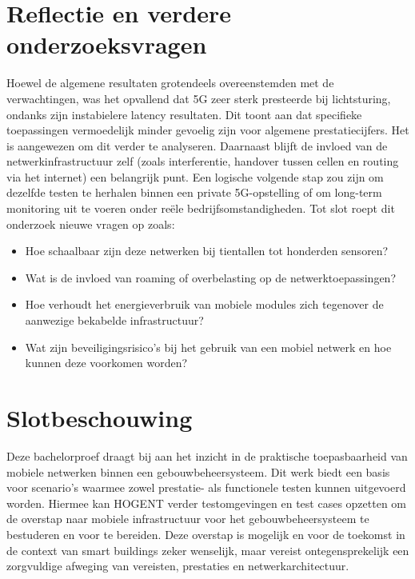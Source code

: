 \section{Reflectie en verdere onderzoeksvragen}
Hoewel de algemene resultaten grotendeels overeenstemden met de verwachtingen, was het opvallend dat 5G zeer sterk presteerde bij lichtsturing, ondanks zijn instabielere latency resultaten. Dit toont aan dat specifieke toepassingen vermoedelijk minder gevoelig zijn voor algemene prestatiecijfers. Het is aangewezen om dit verder te analyseren. Daarnaast blijft de invloed van de netwerkinfrastructuur zelf (zoals interferentie, handover tussen cellen en routing via het internet) een belangrijk punt. Een logische volgende stap zou zijn om dezelfde testen te herhalen binnen een private 5G-opstelling of om long-term monitoring uit te voeren onder reële bedrijfsomstandigheden.
Tot slot roept dit onderzoek nieuwe vragen op zoals: 
\begin{itemize}
    \item Hoe schaalbaar zijn deze netwerken bij tientallen tot honderden sensoren?
    \item Wat is de invloed van roaming of overbelasting op de netwerktoepassingen?
    \item Hoe verhoudt het energieverbruik van mobiele modules zich tegenover de aanwezige bekabelde infrastructuur?
    \item Wat zijn beveiligingsrisico’s bij het gebruik van een mobiel netwerk en hoe kunnen deze voorkomen worden?
\end{itemize}

\section{Slotbeschouwing}
Deze bachelorproef draagt bij aan het inzicht in de praktische toepasbaarheid van mobiele netwerken binnen een gebouwbeheersysteem. Dit werk biedt een basis voor scenario’s waarmee zowel prestatie- als functionele testen kunnen uitgevoerd worden. Hiermee kan HOGENT verder testomgevingen en test cases opzetten om de overstap naar mobiele infrastructuur  voor het gebouwbeheersysteem te bestuderen en voor te bereiden. Deze overstap is mogelijk en voor de toekomst in de context van smart buildings zeker wenselijk, maar vereist ontegensprekelijk een zorgvuldige afweging van vereisten, prestaties en netwerkarchitectuur.

